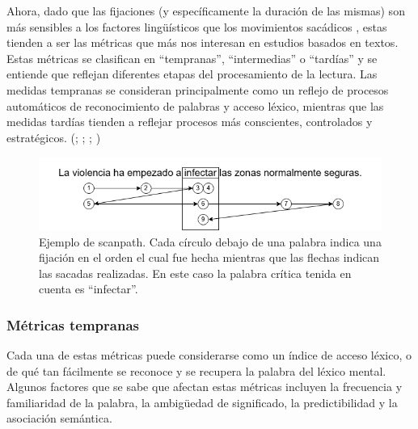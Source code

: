 Ahora, dado que las fijaciones (y específicamente la duración de las mismas) son más sensibles a los factores lingüísticos que los movimientos sacádicos \parencite{StaubRayner2007}, estas tienden a ser las métricas que más nos interesan en estudios basados en textos. Estas métricas se clasifican en “tempranas”, “intermedias” o “tardías” y se entiende que reflejan diferentes etapas del procesamiento de la lectura. Las medidas tempranas se consideran principalmente como un reflejo de procesos automáticos de reconocimiento de palabras y acceso léxico, mientras que las medidas tardías tienden a reflejar procesos más conscientes, controlados y estratégicos. (\cite{Altarriba1996}; \cite{Inhoff1984}; \cite{Paterson1999}; \cite{StaubRayner2007})

\begin{figure}[H]
    \centering
    \includegraphics[width=1\textwidth]{imagenes/scanpath.png}
    \caption{Ejemplo de scanpath. Cada círculo debajo de una palabra indica una fijación en el orden el cual fue hecha mientras que las flechas indican las sacadas realizadas. En este caso la palabra crítica tenida en cuenta es “infectar”.}
    \label{fig:scanpath}
\end{figure}

\subsubsection{Métricas tempranas}

Cada una de estas métricas puede considerarse como un índice de acceso léxico, o de qué tan fácilmente se reconoce y se recupera la palabra del léxico mental. Algunos factores que se sabe que afectan estas métricas incluyen la frecuencia y familiaridad de la palabra, la ambigüedad de significado, la predictibilidad y la asociación semántica.

